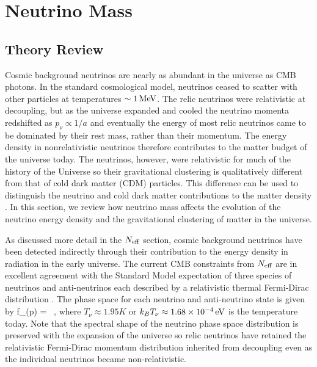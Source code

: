 \section{Neutrino Mass}

\subsection{Theory Review}

Cosmic background neutrinos are nearly as abundant in the universe as CMB photons. In the standard cosmological model, neutrinos ceased to scatter with other particles at temperatures $\sim 1 \, {\rm MeV}$. The relic neutrinos were relativistic at decoupling, but as the universe expanded and cooled the neutrino momenta redshifted as $p_\nu\propto 1/a$ and eventually the energy of most relic neutrinos came to be dominated by their rest mass, rather than their momentum. The energy density in nonrelativistic neutrinos therefore contributes to the matter budget of the universe today. The neutrinos, however, were relativistic for much of the history of the Universe so their gravitational clustering is qualitatively different from that of cold dark matter (CDM) particles. This difference can be used to distinguish the neutrino and cold dark matter contributions to the matter density \cite{Hu:1997mj, Lesgourgues:2006nd, Abazajian:2011dt}.  In this section, we review how neutrino mass affects the evolution of the neutrino energy density and the gravitational clustering of matter in the universe. 
 
As discussed more detail in the $N_{\rm eff}$ section, cosmic background neutrinos have been detected indirectly through their contribution to the energy density in radiation in the early universe. The current CMB constraints from $N_{\rm eff}$ are in excellent agreement with the Standard Model expectation of three species of neutrinos and anti-neutrinos each described by a relativistic thermal Fermi-Dirac distribution \cite{Ade:2015xua}. The phase space for each neutrino and anti-neutrino state is given by
\beq
f_\nu(p) =  \ ,
\eeq
where $T_{\nu} \approx 1.95K$ or $k_B T_{\nu} \approx 1.68 \times 10^{-4}\,{\rm eV}$ is the temperature today. Note that the spectral shape of the neutrino phase space distribution is preserved with the expansion of the universe so relic neutrinos have retained the relativistic Fermi-Dirac momentum distribution inherited from decoupling even as the individual neutrinos became non-relativistic. 

